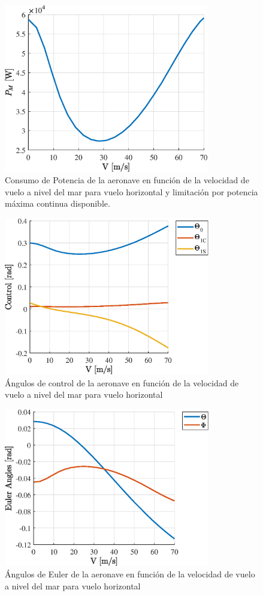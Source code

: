\begin{figure}
	\centering
	\includegraphics[width=90mm]{graficos/PMVH}
	\caption{Consumo de Potencia de la aeronave en función de la velocidad de vuelo a nivel del mar para vuelo horizontal y limitación por potencia máxima continua disponible.}
	\label{PMVH}
\end{figure}
\begin{figure}
	\centering
	\includegraphics[width=90mm]{graficos/ControlVH}
	\caption{Ángulos de control de la aeronave en función de la velocidad de vuelo a nivel del mar para vuelo horizontal}
	\label{ControlVH}
\end{figure}
\begin{figure}
	\centering
	\includegraphics[width=90mm]{graficos/EulerVH}
	\caption{Ángulos de Euler de la aeronave en función de la velocidad de vuelo a nivel del mar para vuelo horizontal}
	\label{EulerVH}
\end{figure}
